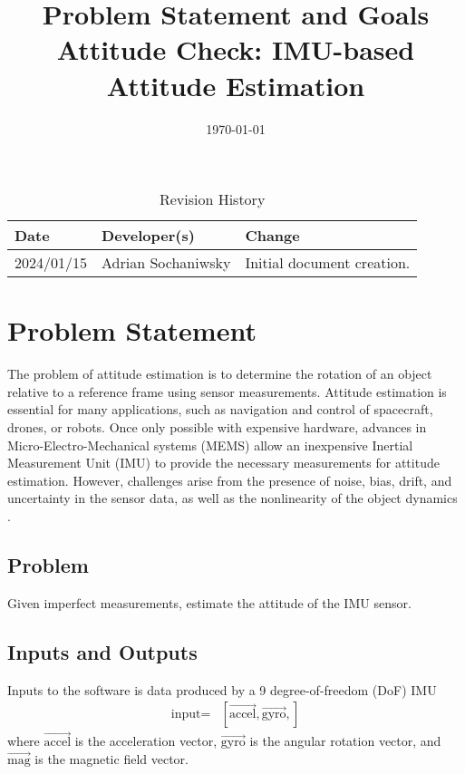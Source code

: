 \documentclass{article}
\title{Problem Statement and Goals \\ Attitude Check: IMU-based Attitude Estimation}
\author{\authname}
\date{\today}
\begin{document}
\maketitle

\begin{table}[hp]
\caption{Revision History} \label{TblRevisionHistory}
\begin{tabularx}{\textwidth}{llX}
\toprule
\textbf{Date} & \textbf{Developer(s)} & \textbf{Change}\\
\midrule
2024/01/15 & Adrian Sochaniwsky & Initial document creation.\\
\bottomrule
\end{tabularx}
\end{table}

\section{Problem Statement}

The problem of attitude estimation is to determine the rotation of an object relative to a reference frame using sensor measurements. Attitude estimation is essential for many applications, such as navigation and control of spacecraft, drones, or robots. Once only possible with expensive hardware, advances in Micro-Electro-Mechanical systems (MEMS) allow an inexpensive Inertial Measurement Unit (IMU) to provide the necessary measurements for attitude estimation. However, challenges arise from the presence of noise, bias, drift, and uncertainty in the sensor data, as well as the nonlinearity of the object dynamics \cite{statement}.

\subsection{Problem}

Given imperfect measurements, estimate the attitude of the IMU sensor.

\subsection{Inputs and Outputs}

Inputs to the software is data produced by a 9 degree-of-freedom (DoF) IMU
\begin{align*}
    \text{input} =& [\vec{\text{accel}}, \vec{\text{gyro}},  ]
\end{align*}
where $\vec{\text{accel}}$ is the acceleration vector, $\vec{\text{gyro}}$ is the angular rotation vector, and $\vec{\text{mag}}$ is the magnetic field vector.
\end{document}

